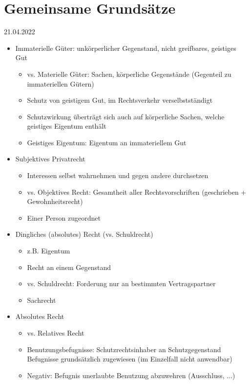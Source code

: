\documentclass{report}
\begin{document}
\section{Gemeinsame Grundsätze}
21.04.2022
\begin{itemize}
	\item Immaterielle Güter:
	\newline unkörperlicher Gegenstand, nicht greifbares, geistiges Gut
	\begin{itemize}
		\item vs. Materielle Güter: Sachen, körperliche Gegenstände (Gegenteil zu immateriellen Gütern)
		\item Schutz von geistigem Gut, im Rechtsverkehr verselbstständigt
		\item Schutzwirkung überträgt sich auch auf körperliche Sachen, welche geistiges Eigentum enthält
		\item Geistiges Eigentum: Eigentum an immateriellem Gut
	\end{itemize}
	\item Subjektives Privatrecht
	\begin{itemize}
		\item Interessen selbst wahrnehmen und gegen andere durchsetzen
		\item vs. Objektives Recht: Gesamtheit aller Rechtsvorschriften (geschrieben + Gewohnheitsrecht)
		\item Einer Person zugeordnet
	\end{itemize}
	\item Dingliches (absolutes) Recht (vs. Schuldrecht) \label{dingliches-recht}
	\begin{itemize}
		\item z.B. Eigentum
		\item Recht an einem Gegenstand
		\item vs. Schuldrecht: Forderung nur an bestimmten Vertragspartner
		\item Sachrecht
	\end{itemize}
	\item Absolutes Recht
	\begin{itemize}
		\item vs. Relatives Recht
		\item Benutzungsbefugnisse: Schutzrechtsinhaber an Schutzgegenstand
		\newline Befugnisse grundsätzlich zugewiesen (im Einzelfall nicht anwendbar)
		\item Negativ: Befugnis unerlaubte Benutzung abzuwehren (Ausschluss, ...)
	\end{itemize}
\end{itemize}
\end{document}
